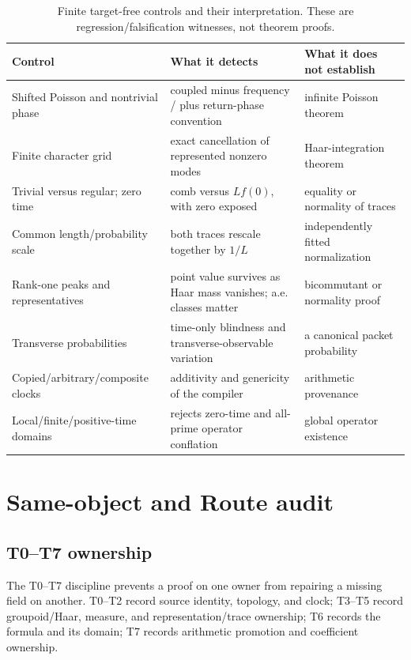 \documentclass[11pt]{article}
\theoremstyle{definition}
\begin{document}
\begin{table}[htbp]
\centering\small
\caption{Finite target-free controls and their interpretation.  These are regression/falsification witnesses, not theorem proofs.}\label{tab:controls}
\begin{tabularx}{\textwidth}{P{0.29\textwidth}Y Y}
\toprule
Control & What it detects & What it does not establish\\
\midrule
Shifted Poisson and nontrivial phase & coupled minus frequency / plus return-phase convention & infinite Poisson theorem\\
Finite character grid & exact cancellation of represented nonzero modes & Haar-integration theorem\\
Trivial versus regular; zero time & comb versus \(Lf(0)\), with zero exposed & equality or normality of traces\\
Common length/probability scale & both traces rescale together by \(1/L\) & independently fitted normalization\\
Rank-one peaks and representatives & point value survives as Haar mass vanishes; a.e. classes matter & bicommutant or normality proof\\
Transverse probabilities & time-only blindness and transverse-observable variation & a canonical packet probability\\
Copied/arbitrary/composite clocks & additivity and genericity of the compiler & arithmetic provenance\\
Local/finite/positive-time domains & rejects zero-time and all-prime operator conflation & global operator existence\\
\bottomrule
\end{tabularx}
\end{table}

\section{Same-object and Route audit}

\subsection{T0--T7 ownership}

The T0--T7 discipline prevents a proof on one owner from repairing a missing field on another.  T0--T2 record source identity, topology, and clock; T3--T5 record groupoid/Haar, measure, and representation/trace ownership; T6 records the formula and its domain; T7 records arithmetic promotion and coefficient ownership.
\end{document}
